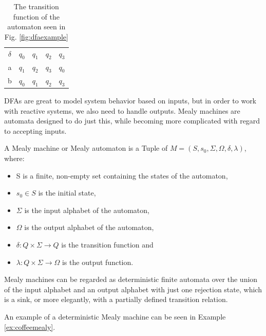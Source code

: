 \begin{table}[H]
\centering
\begin{tabular}{|c|cccc|}
	\hline
	$\delta$ & $q_0$ & $q_1$ & $q_2$ & $q_3$\\ \cline{1-5}
	a & $q_1$ & $q_2$ & $q_3$ & $q_0$ \\	
	b & $q_0$ & $q_1$ & $q_2$ & $q_3$ \\	\hline
\end{tabular}
\caption{The transition function of the automaton seen in Fig. \ref{fig:dfaexample}}
\label{tab:dfaexampledelta}
\end{table}

DFAs are great to model system behavior based on inputs, but in order to work with reactive systems, we also need to handle outputs. Mealy machines are automata designed to do just this, while becoming more complicated with regard to accepting inputs.


\begin{definition}
	A Mealy machine or Mealy automaton is a Tuple of $ M=(S,s_{0},\Sigma,\Omega,\delta,\lambda) $, where:
	\begin{itemize}
		\item S is a finite, non-empty set containing the states of the automaton,
		\item $s_{0} \in S$ is the initial state,
		\item $\Sigma$ is the input alphabet of the automaton,
		\item $\Omega$ is the output alphabet of the automaton,
		\item $\delta: Q\times \Sigma \to Q$ is the transition function and
		\item $\lambda: Q\times \Sigma \to \Omega$ is the output function. 
	\end{itemize}
\end{definition}

Mealy machines can be regarded as deterministic finite automata over the union of the input alphabet and an output alphabet with just one rejection state, which is a sink, or more elegantly, with a partially defined transition relation. 

An example of a deterministic Mealy machine can be seen in Example \ref{ex:coffeemealy}.

